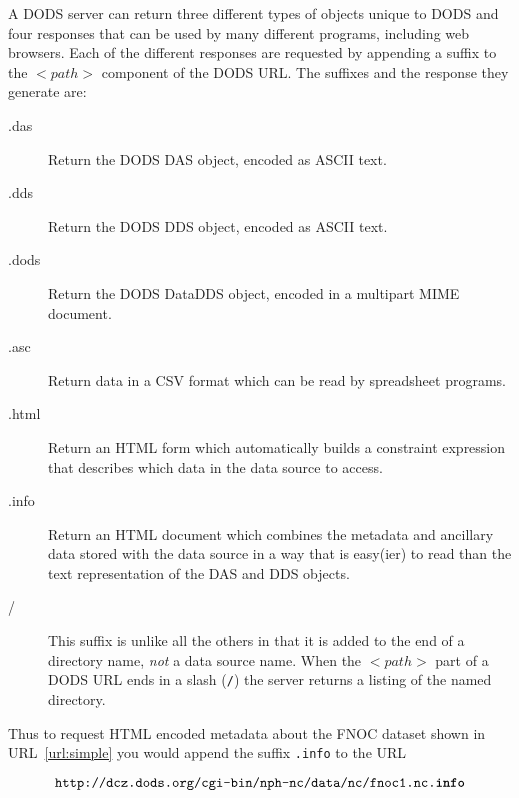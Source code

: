 \documentclass{article}
\begin{document}
A DODS server can return three different types of objects unique to DODS and
four responses that can be used by many different programs, including web
browsers. Each of the different responses are requested by appending a suffix
to the $<path>$ component of the DODS URL. The suffixes and the response they
generate are:
\begin{description}
\item[.das] Return the DODS DAS object, encoded as ASCII text.
\item[.dds] Return the DODS DDS object, encoded as ASCII text.
\item[.dods] Return the DODS DataDDS object, encoded in a multipart MIME
  document. 
\item[.asc] Return data in a CSV format which can be read by spreadsheet
  programs.
\item[.html] Return an HTML form which automatically builds a constraint
  expression that describes which data in the data source to access.
\item[.info] Return an HTML document which combines the metadata and
  ancillary data stored with the data source in a way that is easy(ier) to
  read than the text representation of the DAS and DDS objects.
\item[/] This suffix is unlike all the others in that it is added to the
  end of a directory name, \emph{not} a data source name. When the $<path>$
  part of a DODS URL ends in a slash (\texttt{/}) the server returns a
  listing of the named directory.
\end{description}
Thus to request HTML encoded metadata about the FNOC dataset shown in
URL~\ref{url:simple} you would append the suffix \texttt{.info} to the URL

\begin{equation}
\texttt{http://dcz.dods.org/cgi-bin/nph-nc/data/nc/fnoc1.nc.\textbf{info}}
\label{url:info}
\end{equation}
\end{document}

